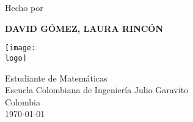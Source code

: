 \documentclass[twoside]{article}
\newcommand{\logo}{"C:/Users/usuario/OneDrive/Documentos/U/logo-eci.jpg"}
\renewcommand{\author}{David Gómez, Laura Rincón}
\renewcommand{\title}{Sumatorios}
\begin{document}
\begin{titlepage}
    \begin{center}
        \vspace*{1cm}
 
        \textbf{\fontsize{45}{\baselineskip}\selectfont{\title}}

        \vspace{3cm}

        {\Large Hecho por}

        \vspace{1cm}

        {\textbf{\LARGE\MakeUppercase{\author}}}

        \vspace{2cm}

        \texttt{[image: \\logo]}

        \vspace{2cm}

        {\Large Estudiante de Matemáticas\\[5pt]

        Escuela Colombiana de Ingeniería Julio Garavito\\[5pt]

        Colombia\\[5pt]

        \today}
             
    \end{center}
\end{titlepage}

\tableofcontents
\clearpage





\end{document}
